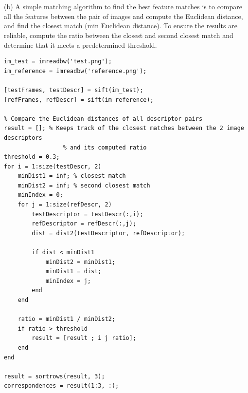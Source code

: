 \documentclass[11pt]{article}
\begin{document}
\\\\
(b) A simple matching algorithm to find the best feature matches is to compare all the features between the pair of images and compute the Euclidean distance, and find the closest match (min Euclidean distance). To ensure the results are reliable, compute the ratio between the closest and second closest match and determine that it meets a predetermined threshold.
\begin{lstlisting}
im_test = imreadbw('test.png');
im_reference = imreadbw('reference.png');

[testFrames, testDescr] = sift(im_test);
[refFrames, refDescr] = sift(im_reference);

% Compare the Euclidean distances of all descriptor pairs
result = []; % Keeps track of the closest matches between the 2 image descriptors
                 % and its computed ratio
threshold = 0.3;
for i = 1:size(testDescr, 2)
    minDist1 = inf; % closest match
    minDist2 = inf; % second closest match
    minIndex = 0;
    for j = 1:size(refDescr, 2)
        testDescriptor = testDescr(:,i);
        refDescriptor = refDescr(:,j);
        dist = dist2(testDescriptor, refDescriptor);
        
        if dist < minDist1
            minDist2 = minDist1;
            minDist1 = dist;
            minIndex = j;
        end
    end
    
    ratio = minDist1 / minDist2;
    if ratio > threshold
        result = [result ; i j ratio];
    end
end

result = sortrows(result, 3);
correspondences = result(1:3, :);
\end{lstlisting}
\end{document}
